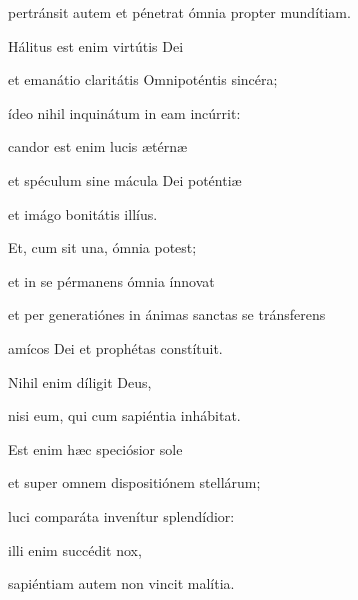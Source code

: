 {\noindent pertránsit autem et pénetrat ómnia propter mundítiam. 

\noindent Hálitus est enim virtútis Dei 

\noindent et emanátio claritátis Omnipoténtis sincéra; 

\noindent ídeo nihil inquinátum in eam incúrrit: 

\noindent candor est enim lucis ætérnæ 

\noindent et spéculum sine mácula Dei poténtiæ

\noindent et imágo bonitátis illíus. 

\noindent Et, cum sit una, ómnia potest; 

\noindent et in se pérmanens ómnia ínnovat 

\noindent et per generatiónes in ánimas sanctas se tránsferens

\noindent amícos Dei et prophétas constítuit. 

\noindent Nihil enim díligit Deus,

\noindent nisi eum, qui cum sapiéntia inhábitat. 

\noindent Est enim hæc speciósior sole

\noindent et super omnem dispositiónem stellárum;

\noindent luci comparáta invenítur splendídior:

\noindent illi enim succédit nox,

\noindent sapiéntiam autem non vincit malítia.}
\newcommand{\responsoriumi}{\pars{Responsorium 1.} \scriptura{\Rbardot{} Sap. 7, 10-11 \Vbardot{} Prov. 7, 4; \textbf{H401}}

\vspace{-5mm}

\responsorium{III}{temporalia/resp-supersalutem-CROCHU.gtex}{}}
